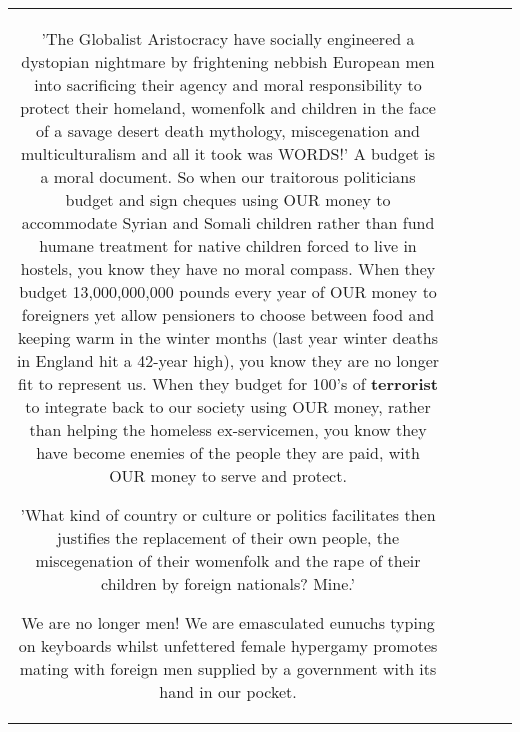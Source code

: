 \documentclass[11pt]{article}
\newlength\mylength
\begin{document}
\begin{center}
\begin{longtable}{|C{.65\mylength}|C{.30\mylength}|C{.12\mylength}|C{.12\mylength}|C{.12\mylength}|}
'The Globalist Aristocracy have socially engineered a dystopian nightmare by frightening nebbish European men into sacrificing their agency and moral responsibility to protect their homeland, womenfolk and children in the face of a savage desert death mythology, miscegenation and multiculturalism and all it took was WORDS!'
A budget is a moral document. So when our traitorous politicians budget and sign cheques using OUR money to accommodate Syrian and Somali children rather than fund humane treatment for native children forced to live in hostels, you know they have no moral compass. When they budget 13,000,000,000 pounds every year of OUR money to foreigners yet allow pensioners to choose between food and keeping warm in the winter months (last year winter deaths in England hit a 42-year high), you know they are no longer fit to represent us. When they budget for 100's of \textbf{terrorist} to integrate back to our society using OUR money, rather than helping the homeless ex-servicemen, you know they have become enemies of the people they are paid, with OUR money to serve and protect.

'What kind of country or culture or politics facilitates then justifies the replacement of their own people, the miscegenation of their womenfolk and the rape of their children by foreign nationals? Mine.'

We are no longer men! We are emasculated eunuchs typing on keyboards whilst unfettered female hypergamy promotes mating with foreign men supplied by a government with its hand in our pocket. 


\end{longtable}
\end{center}
\end{document}
